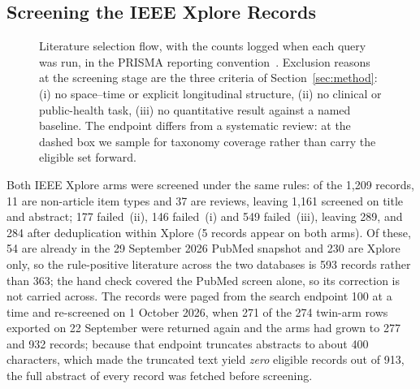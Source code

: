 \documentclass[journal]{IEEEtran}
\begin{document}
\subsection{Screening the IEEE Xplore Records}
\label{sec:ieeescreen}
\begin{figure}[t]
\centering
{}
\caption{Literature selection flow, with the counts logged when each query was run, in the PRISMA reporting convention~\cite{page2021prisma}. Exclusion reasons at the screening stage are the three criteria of Section~\ref{sec:method}: (i) no space--time or explicit longitudinal structure, (ii) no clinical or public-health task, (iii) no quantitative result against a named baseline. The endpoint differs from a systematic review: at the dashed box we sample for taxonomy coverage rather than carry the eligible set forward.}
\label{fig:prisma}
\end{figure}
Both IEEE Xplore arms were screened under the same rules: of the 1{,}209 records, 11 are non-article item types and 37 are reviews, leaving 1{,}161 screened on title and abstract; 177 failed~(ii), 146 failed~(i) and 549 failed~(iii), leaving 289, and 284 after deduplication within Xplore (5 records appear on both arms). Of these, 54 are already in the 29 September 2026 PubMed snapshot and 230 are Xplore only, so the rule-positive literature across the two databases is 593 records rather than 363; the hand check covered the PubMed screen alone, so its correction is not carried across. The records were paged from the search endpoint 100 at a time and re-screened on 1 October 2026, when 271 of the 274 twin-arm rows exported on 22 September were returned again and the arms had grown to 277 and 932 records; because that endpoint truncates abstracts to about 400 characters, which made the truncated text yield \emph{zero} eligible records out of 913, the full abstract of every record was fetched before screening.
\end{document}
